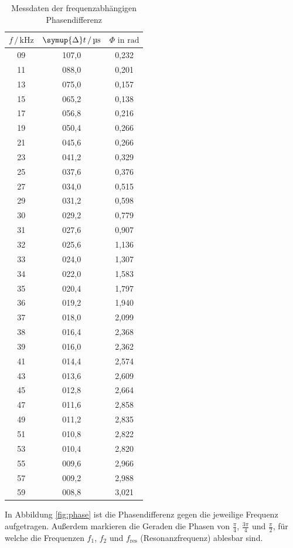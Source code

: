 \begin{table}
  \centering
  \caption{Messdaten der frequenzabhängigen Phasendifferenz}
  \label{tab:Messdaten3}
  \begin{tabular}{c c c}
  \toprule
  $f \,/\, \si{\kilo\hertz}$ & $\symup{\Delta} t \,/\, \si{\micro\second}$ & $\Phi \,\, \text{in rad} $ \\
  \midrule
09 & 107,0 & 0,232 \\
11 & 088,0 & 0,201 \\
13 & 075,0 & 0,157 \\
15 & 065,2 & 0,138 \\
17 & 056,8 & 0,216 \\
19 & 050,4 & 0,266 \\
21 & 045,6 & 0,266 \\
23 & 041,2 & 0,329 \\
25 & 037,6 & 0,376 \\
27 & 034,0 & 0,515 \\
29 & 031,2 & 0,598 \\
30 & 029,2 & 0,779 \\
31 & 027,6 & 0,907 \\
32 & 025,6 & 1,136 \\
33 & 024,0 & 1,307 \\
34 & 022,0 & 1,583 \\
35 & 020,4 & 1,797 \\
36 & 019,2 & 1,940 \\
37 & 018,0 & 2,099 \\
38 & 016,4 & 2,368 \\
39 & 016,0 & 2,362 \\
41 & 014,4 & 2,574 \\
43 & 013,6 & 2,609 \\
45 & 012,8 & 2,664 \\
47 & 011,6 & 2,858 \\
49 & 011,2 & 2,835 \\
51 & 010,8 & 2,822 \\
53 & 010,4 & 2,820 \\
55 & 009,6 & 2,966 \\
57 & 009,2 & 2,988 \\
59 & 008,8 & 3,021 \\
  \bottomrule
  \end{tabular}
  \end{table} 

  In Abbildung \ref{fig:phase} ist die Phasendifferenz gegen die jeweilige Frequenz 
  aufgetragen. Außerdem markieren die Geraden die Phasen von
  $\frac{\pi}{4}$, $\frac{3 \pi}{4}$ und $\frac{\pi}{2}$, für welche die Frequenzen 
  $f_1$, $f_2$ und $f_\text{res}$ (Resonanzfrequenz)
  ablesbar sind.

